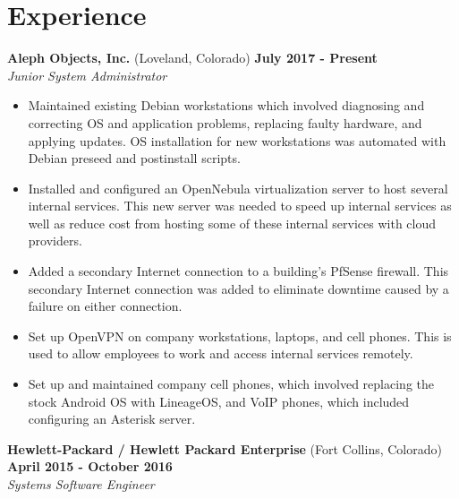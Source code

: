 \documentclass[letterpaper,10pt]{article}
\begin{document}
    \section*{Experience}
        \textbf{Aleph Objects, Inc.} (Loveland, Colorado) \hfill \textbf{July 2017 - Present} \\[1pt]
        \emph{Junior System Administrator}
        \begin{itemize}
            \item Maintained existing Debian workstations which involved diagnosing and correcting OS and application problems, replacing faulty hardware, and applying updates. OS installation for new workstations was automated with Debian preseed and postinstall scripts.
            \item Installed and configured an OpenNebula virtualization server to host several internal services. This new server was needed to speed up internal services as well as reduce cost from hosting some of these internal services with cloud providers.
            \item Added a secondary Internet connection to a building's PfSense firewall. This secondary Internet connection was added to eliminate downtime caused by a failure on either connection.
            \item Set up OpenVPN on company workstations, laptops, and cell phones. This is used to allow employees to work and access internal services remotely.
            \item Set up and maintained company cell phones, which involved replacing the stock Android OS with LineageOS, and VoIP phones, which included configuring an Asterisk server.
        \end{itemize}
        \vspace*{2ex}
        \textbf{Hewlett-Packard / Hewlett Packard Enterprise} (Fort Collins, Colorado) \hfill \textbf{April 2015 - October 2016} \\[1pt]
        \emph{Systems Software Engineer}
\end{document}
